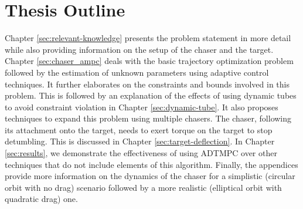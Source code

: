 \section{Thesis Outline}
Chapter \ref{sec:relevant-knowledge} presents the problem statement in more detail while also providing information on the setup of the chaser and the target.
Chapter \ref{sec:chaser_ampc} deals with the basic trajectory optimization problem followed by the estimation of unknown parameters using adaptive control techniques.
It further elaborates on the constraints and bounds involved in this problem. 
This is followed by an explanation of the effects of using dynamic tubes to avoid constraint violation in Chapter \ref{sec:dynamic-tube}.
It also proposes techniques to expand this problem using multiple chasers.
The chaser, following its attachment onto the target, needs to exert torque on the target to stop detumbling.
This is discussed in Chapter \ref{sec:target-deflection}.
In Chapter \ref{sec:results}, we demonstrate the effectiveness of using ADTMPC over other techniques that do not include elements of this algorithm.
Finally, the appendices provide more information on the dynamics of the chaser for a simplistic (circular orbit with no drag) scenario followed by a more realistic (elliptical orbit with quadratic drag) one.